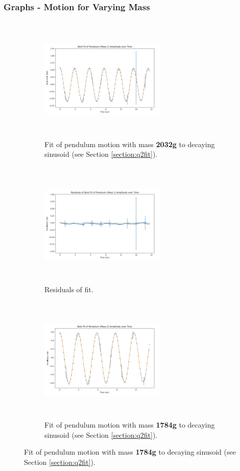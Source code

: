 \documentclass[12pt]{article}
\begin{document}
\subsubsection{Graphs - Motion for Varying Mass}
\begin{figure}[h]
    \centering
    \begin{subfigure}[b]{0.48\textwidth}
        \centering
        \includegraphics[width=6cm,height=6cm, keepaspectratio]{q4b_fit1.png}
        \caption{Fit of pendulum motion with mass \textbf{2032g} to decaying sinusoid (see Section \ref{section:q2fit}).}

    \end{subfigure}
    \hfill
    \begin{subfigure}[b]{0.48\textwidth}
        \centering
        \includegraphics[width=6cm,height=6cm, keepaspectratio]{q4b_residuals1.png}
        \caption{Residuals of fit.}

    \end{subfigure}
    \begin{subfigure}[b]{0.48\textwidth}
        \centering
        \includegraphics[width=6cm,height=6cm, keepaspectratio]{q4b_fit2.png}
        \caption{Fit of pendulum motion with mass \textbf{1784g} to decaying sinusoid (see Section \ref{section:q2fit}).}


\end{subfigure}
\end{figure}
\end{document}
